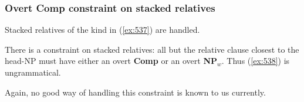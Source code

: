 \subsubsection{Overt Comp constraint on stacked relatives} 
Stacked relatives of the kind in (\ref{ex:537}) are handled. 
 
\beginsentences
{}\label{ex:537} 
\endsentences

 
There is a constraint on stacked relatives: all but the relative clause 
closest to the head-NP must have either an overt {\bf Comp} or 
an overt {\bf NP$_{w}$}. Thus (\ref{ex:538}) is ungrammatical. 
 
\beginsentences
{}\label{ex:538} 
\endsentences

 
Again, no good way of handling this constraint is known to us 
currently. 
